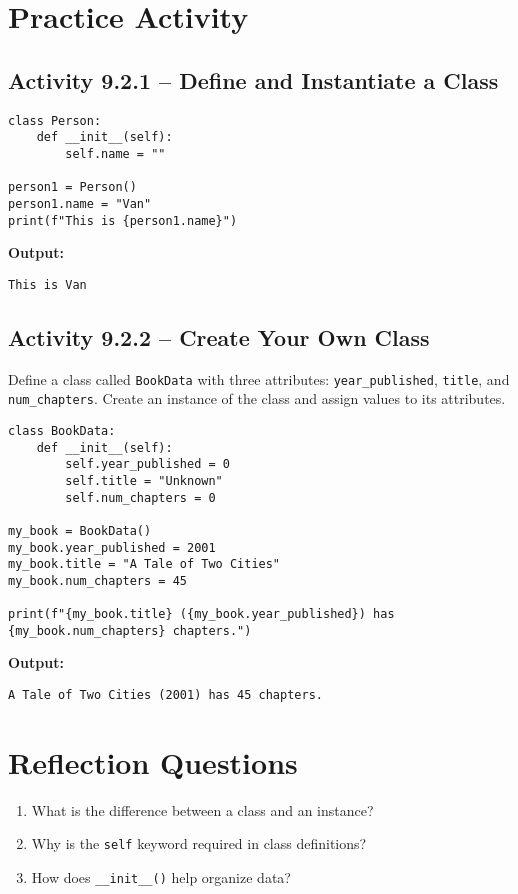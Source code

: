 \section{Practice Activity}

\subsection*{Activity 9.2.1 – Define and Instantiate a Class}

\begin{verbatim}
class Person:
    def __init__(self):
        self.name = ""

person1 = Person()
person1.name = "Van"
print(f"This is {person1.name}")
\end{verbatim}

\textbf{Output:}
\begin{verbatim}
This is Van
\end{verbatim}

\subsection*{Activity 9.2.2 – Create Your Own Class}

Define a class called \texttt{BookData} with three attributes:
\texttt{year\_published}, \texttt{title}, and \texttt{num\_chapters}.
Create an instance of the class and assign values to its attributes.

\begin{verbatim}
class BookData:
    def __init__(self):
        self.year_published = 0
        self.title = "Unknown"
        self.num_chapters = 0

my_book = BookData()
my_book.year_published = 2001
my_book.title = "A Tale of Two Cities"
my_book.num_chapters = 45

print(f"{my_book.title} ({my_book.year_published}) has {my_book.num_chapters} chapters.")
\end{verbatim}

\textbf{Output:}
\begin{verbatim}
A Tale of Two Cities (2001) has 45 chapters.
\end{verbatim}

\section*{Reflection Questions}
\begin{enumerate}
    \item What is the difference between a class and an instance?
    \item Why is the \texttt{self} keyword required in class definitions?
    \item How does \texttt{\_\_init\_\_()} help organize data?
\end{enumerate}

